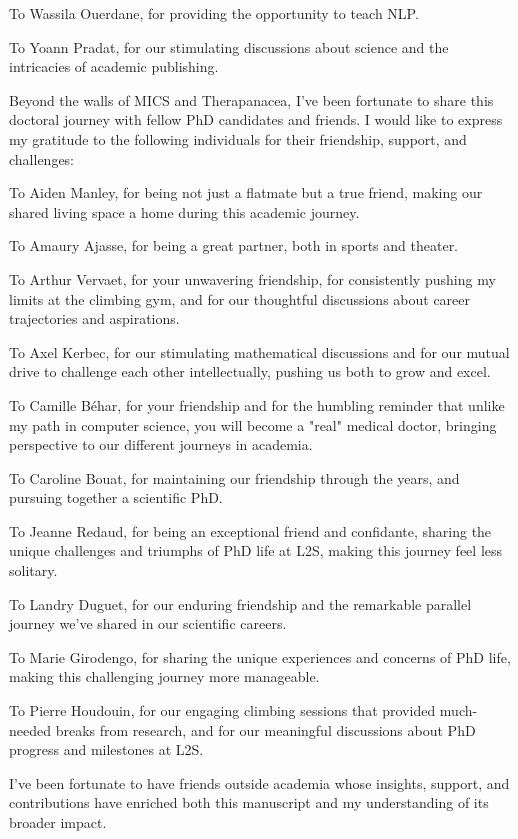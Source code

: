 To Wassila Ouerdane, for providing the opportunity to teach NLP.

To Yoann Pradat, for our stimulating discussions about science and the intricacies of academic publishing.



Beyond the walls of MICS and Therapanacea, I've been fortunate to share this doctoral journey with fellow PhD candidates and friends.
I would like to express my gratitude to the following individuals for their friendship, support, and challenges:

To Aiden Manley, for being not just a flatmate but a true friend, making our shared living space a home during this academic journey.

To Amaury Ajasse, for being  a great partner, both in sports and theater.

To Arthur Vervaet, for your unwavering friendship, for consistently pushing my limits at the climbing gym, and for our thoughtful discussions about career trajectories and aspirations.

To Axel Kerbec, for our stimulating mathematical discussions and for our mutual drive to challenge each other intellectually, pushing us both to grow and excel.

To Camille Béhar, for your friendship and for the humbling reminder that unlike my path in computer science, you will become a "real" medical doctor, bringing perspective to our different journeys in academia.

To Caroline Bouat, for maintaining our friendship through the years, and pursuing together a scientific PhD.

To Jeanne Redaud, for being an exceptional friend and confidante, sharing the unique challenges and triumphs of PhD life at L2S, making this journey feel less solitary.

To Landry Duguet, for our enduring friendship and the remarkable parallel journey we've shared in our scientific careers.

To Marie Girodengo, for sharing the unique experiences and concerns of PhD life, making this challenging journey more manageable.

To Pierre Houdouin, for our engaging climbing sessions that provided much-needed breaks from research, and for our meaningful discussions about PhD progress and milestones at L2S.



I've been fortunate to have friends outside academia whose insights, support, and contributions have enriched both this manuscript and my understanding of its broader impact.

